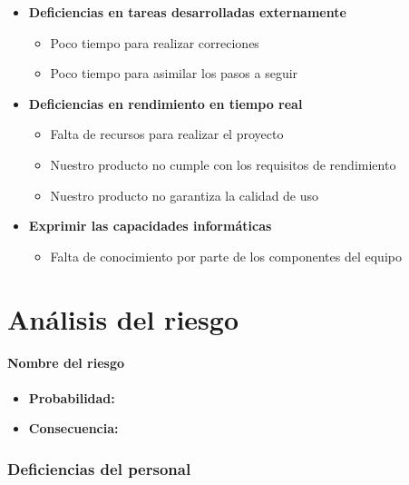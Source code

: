 \documentclass[spanish,a4paper,12pt]{report}	%
\begin{document}
\begin{itemize}
\begin{itemize}
	\end{itemize}
\item \textbf {Deficiencias en tareas desarrolladas externamente}
	\begin{itemize}
		\item {Poco tiempo para realizar correciones}
		\item {Poco tiempo para asimilar los pasos a seguir}
	\end{itemize}
\item \textbf {Deficiencias en rendimiento en tiempo real}
	\begin{itemize}
		\item {Falta de recursos para realizar el proyecto}
		\item {Nuestro producto no cumple con los requisitos de rendimiento}
		\item {Nuestro producto no garantiza la calidad de uso}
	\end{itemize}
\item \textbf {Exprimir las capacidades informáticas}
	\begin{itemize}
		\item {Falta de conocimiento por parte de los componentes del equipo}
	\end{itemize}
\end{itemize}


\newpage
\mbox{}
\thispagestyle{empty}						%
\newpage

\part{Análisis del riesgo}

\subsection*{Nombre del riesgo}			%
	\begin{itemize}
		\item \textbf {Probabilidad: }
		\item \textbf {Consecuencia: }
	\end{itemize}


\section{Deficiencias del personal}
%
\end{document}
